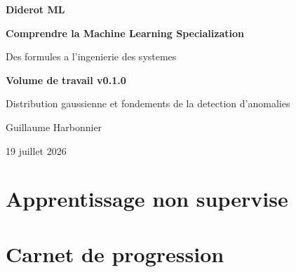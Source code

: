 \documentclass[11pt,twoside,openright]{book}
\begin{document}
\frontmatter
\begin{titlepage}
  \centering
  \vspace*{23mm}
  {\sffamily\bfseries\color{DiderotRed}\fontsize{30}{35}\selectfont
   Diderot ML\par}
  \vspace{5mm}
  {\sffamily\bfseries\fontsize{22}{27}\selectfont
   Comprendre la Machine Learning Specialization\par}
  \vspace{6mm}
  {\Large Des formules a l'ingenierie des systemes\par}
  \vfill
  \begin{tcolorbox}[width=.82\textwidth,colback=DiderotMint,colframe=DiderotBlue,arc=1mm]
  \centering
  \textbf{Volume de travail v0.1.0}\par
  Distribution gaussienne et fondements de la detection d'anomalies
  \end{tcolorbox}
  \vfill
  {\large Guillaume Harbonnier\par}
  \vspace{2mm}
  {\small 19 juillet 2026\par}
\end{titlepage}


\tableofcontents

\mainmatter
\part{Apprentissage non supervise}


\part{Carnet de progression}


\backmatter

\end{document}

